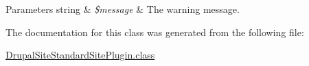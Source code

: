\begin{DoxyParams}[1]{Parameters}
string & {\em \$message} & The warning message. \\
\hline
\end{DoxyParams}


The documentation for this class was generated from the following file\-:\begin{DoxyCompactItemize}
\item 
\hyperlink{DrupalSiteStandardSitePlugin_8class}{Drupal\-Site\-Standard\-Site\-Plugin.\-class}\end{DoxyCompactItemize}
